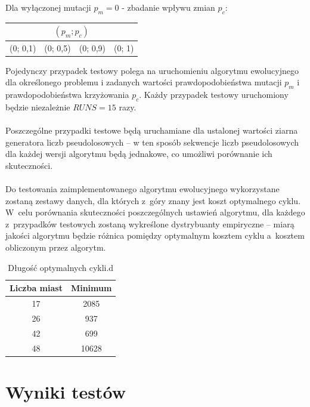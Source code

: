 \documentclass[12pt, a4paper]{article}
\begin{document}
\bigskip

Dla wyłączonej mutacji $p_m = 0$ - zbadanie wpływu zmian $p_c$:
\begin{center}
\begin{tabular}{|l|l|l|l|}
\hline
\multicolumn{4}{|c|}{$(p_m; p_c)$} \\
\hline
(0; 0,1) & (0; 0,5) & (0; 0,9) & (0; 1)\\
\hline
\end{tabular}
\end{center}

\bigskip

Pojedynczy przypadek testowy polega na uruchomieniu algorytmu ewolucyjnego dla określonego 
problemu i zadanych wartości prawdopodobieństwa mutacji $p_m$ i prawdopodobieństwa 
krzyżowania $p_c$. Każdy przypadek testowy uruchomiony będzie niezależnie $RUNS = 15$ razy.\\
\\
Poszczególne przypadki testowe będą uruchamiane dla ustalonej wartości ziarna generatora 
liczb pseudolosowych -- w ten sposób sekwencje liczb pseudolosowych dla każdej wersji 
algorytmu będą jednakowe, co umożliwi porównanie ich skuteczności.\\
\\
Do testowania zaimplementowanego algorytmu ewolucyjnego wykorzystane zostaną zestawy danych,
dla których z~góry znany jest koszt optymalnego cyklu. W~celu porównania skuteczności 
poszczególnych ustawień algorytmu, dla każdego z~przypadków testowych zostaną wykreślone 
dystrybuanty empiryczne -- miarą jakości algorytmu będzie różnica pomiędzy optymalnym 
kosztem cyklu a~kosztem obliczonym przez algorytm.

\begin{table}[h]
  \centering
  \begin{tabular}{ | c | c | }
    \hline
    Liczba miast & Minimum\\
    \hline
    17 & 2085\\
    \hline
    26 & 937\\
    \hline
    42 & 699\\
    \hline
    48 & 10628\\
    \hline
  \end{tabular}
  \caption{Długość optymalnych cykli.d}
\end{table}

\section{Wyniki testów}
\end{document}
